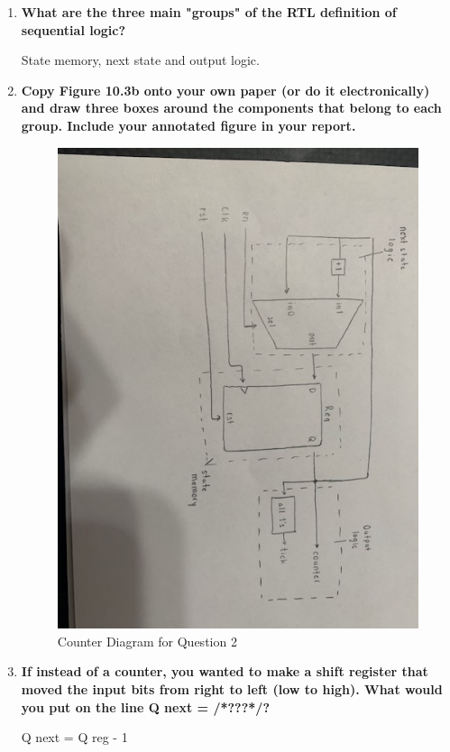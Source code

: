 \documentclass[11pt]{article}
\begin{document}
\begin{enumerate}
	
	\item \textbf{What are the three main "groups" of the RTL definition of sequential logic?}
	
	State memory, next state and output logic. 
	
	\item \textbf{Copy Figure 10.3b onto your own paper (or do it electronically) and draw three boxes around the components that belong to each group. Include your annotated figure in your report.}
	
	\begin{figure}[ht]\centering	
		
		\includegraphics[width=.85\textwidth,angle=0,origin=c]{Counter}
		\caption{Counter Diagram for Question 2}
		\label{fig:sim_with_table}
		
	\end{figure}
	
	\item \textbf{If instead of a counter, you wanted to make a shift register that moved the input bits from right to left (low to high). What would you put on the line Q next = /*???*/?}
	
	Q next = Q reg - 1
	
\end{enumerate}
\end{document}
